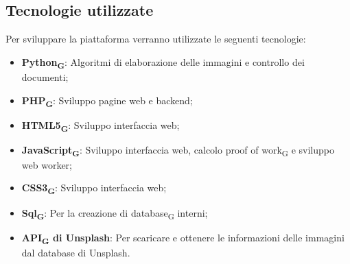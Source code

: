 \subsection{Tecnologie utilizzate}
Per sviluppare la piattaforma verranno utilizzate le seguenti tecnologie:
\begin{itemize}
    \item \textbf{Python\textsubscript{G}}: Algoritmi di elaborazione delle immagini e controllo dei documenti;
    \item \textbf{PHP\textsubscript{G}}: Sviluppo pagine web e backend;
    \item \textbf{HTML5\textsubscript{G}}: Sviluppo interfaccia web;
    \item \textbf{JavaScript\textsubscript{G}}: Sviluppo interfaccia web, calcolo proof of work\textsubscript{G} e sviluppo web worker;
    \item \textbf{CSS3\textsubscript{G}}: Sviluppo interfaccia web;
    \item \textbf{Sql\textsubscript{G}}: Per la creazione di database\textsubscript{G} interni;
    \item \textbf{API\textsubscript{G} di Unsplash}: Per scaricare e ottenere le informazioni delle immagini dal database di Unsplash.
\end{itemize}


